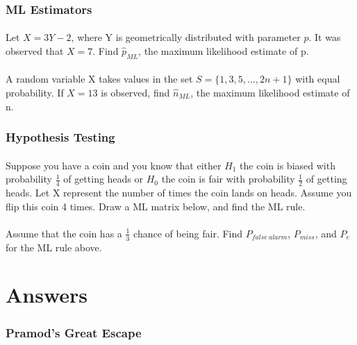 \documentclass{exam}
\renewcommand\thesection{Q\arabic{section}:}
\renewcommand\thesubsection{Part \Alph{subsection}:}
\begin{document}
\section{ ML Estimators }
\subsection{}
Let $X = 3Y - 2$, where Y is geometrically distributed with parameter $p$. It was observed that $X = 7$. Find $\widehat{p}_{ML}$, the maximum likelihood estimate of p.
\vspace{4cm}

\subsection{}
A random variable X takes values in the set $S = \{1,3,5, ... 
 , 2n + 1\}$ with equal probability. If $X = 13$ is observed, find $\widehat{n}_{ML}$, the maximum likelihood estimate of n.
 \vspace{4cm}

\section{ Hypothesis Testing }
\subsection{}
Suppose you have a coin and you know that either $H_1$ the coin is biased with probability $\frac{1}{4}$ of getting heads or $H_0$ the coin is fair with probability $\frac{1}{2}$ of getting heads. Let X represent the number of times the coin lands on heads. Assume you flip this coin 4 times. Draw a ML matrix below, and find the ML rule.
\vspace{6cm}

\subsection{}
Assume that the coin has a $\frac{1}{3}$ chance of being fair. Find $P_{false\ alarm}$, $P_{miss}$, and $P_e$ for the ML rule above.
 


\newpage
\renewcommand\thesection{Answer to Q\arabic{section}:}
\renewcommand\thesubsection{Part \Alph{subsection}:}
\setcounter{section}{0}
\part*{Answers}
\section{Pramod's Great Escape}
\end{document}

